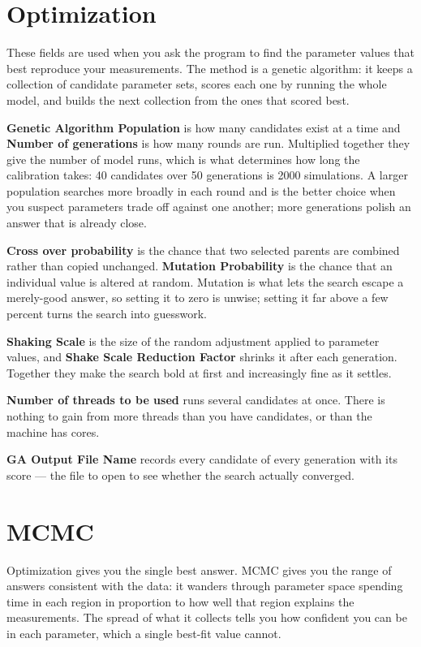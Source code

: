 \section{Optimization}

These fields are used when you ask the program to find the parameter values that
best reproduce your measurements. The method is a genetic algorithm: it keeps a
collection of candidate parameter sets, scores each one by running the whole
model, and builds the next collection from the ones that scored best.

\textbf{Genetic Algorithm Population} is how many candidates exist at a time and
\textbf{Number of generations} is how many rounds are run. Multiplied together
they give the number of model runs, which is what determines how long the
calibration takes: 40 candidates over 50 generations is 2000 simulations. A
larger population searches more broadly in each round and is the better choice
when you suspect parameters trade off against one another; more generations
polish an answer that is already close.

\textbf{Cross over probability} is the chance that two selected parents are
combined rather than copied unchanged. \textbf{Mutation Probability} is the
chance that an individual value is altered at random. Mutation is what lets the
search escape a merely-good answer, so setting it to zero is unwise; setting it
far above a few percent turns the search into guesswork.

\textbf{Shaking Scale} is the size of the random adjustment applied to parameter
values, and \textbf{Shake Scale Reduction Factor} shrinks it after each
generation. Together they make the search bold at first and increasingly fine as
it settles.

\textbf{Number of threads to be used} runs several candidates at once. There is
nothing to gain from more threads than you have candidates, or than the machine
has cores.

\textbf{GA Output File Name} records every candidate of every generation with
its score --- the file to open to see whether the search actually converged.

\section{MCMC}

Optimization gives you the single best answer. MCMC gives you the range of
answers consistent with the data: it wanders through parameter space spending
time in each region in proportion to how well that region explains the
measurements. The spread of what it collects tells you how confident you can be
in each parameter, which a single best-fit value cannot.

